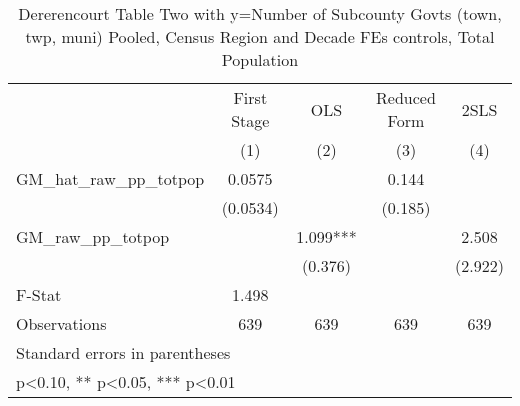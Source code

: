 \begin{table}[htbp]\centering
\def\sym#1{\ifmmode^{#1}\else\(^{#1}\)\fi}
\caption{Dererencourt Table Two with y=Number of Subcounty Govts (town, twp, muni)  Pooled, Census Region and Decade FEs controls, Total Population}
\begin{tabular}{l*{4}{c}}
\toprule
                    & First Stage   &         OLS   &Reduced Form   &        2SLS   \\
                    &\multicolumn{1}{c}{(1)}   &\multicolumn{1}{c}{(2)}   &\multicolumn{1}{c}{(3)}   &\multicolumn{1}{c}{(4)}   \\
\midrule
GM\_hat\_raw\_pp\_totpop&      0.0575   &               &       0.144   &               \\
                    &    (0.0534)   &               &     (0.185)   &               \\
\addlinespace
GM\_raw\_pp\_totpop    &               &       1.099***&               &       2.508   \\
                    &               &     (0.376)   &               &     (2.922)   \\
\midrule
F-Stat              &       1.498   &               &               &               \\
Observations        &         639   &         639   &         639   &         639   \\
\bottomrule
\multicolumn{5}{l}{\footnotesize Standard errors in parentheses}\\
\multicolumn{5}{l}{\footnotesize * p<0.10, ** p<0.05, *** p<0.01}\\
\end{tabular}
\end{table}
